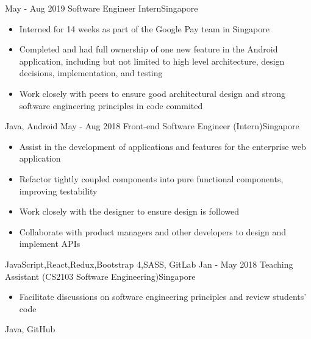 %
%
%

\begin{experiences}
  \experience
    {May - Aug 2019}   {Software Engineer Intern}{}{Singapore}
    {} {
                      \begin{itemize}
                        \item Interned for 14 weeks as part of the Google Pay team in Singapore
                        \item Completed and had full ownership of one new feature in the Android application, including but not limited to high level architecture, design decisions, implementation, and testing
                        \item Work closely with peers to ensure good architectural design and strong software engineering principles in code commited
                      \end{itemize}
                    }
                    {Java, Android}
  \emptySeparator
  \experience
    {May - Aug 2018}   {Front-end Software Engineer (Intern)}{}{Singapore}
    {} {
                      \begin{itemize}
                        \item Assist in the development of applications and features for the enterprise web application
                        \item Refactor tightly coupled components into pure functional components, improving testability
                        \item Work closely with the designer to ensure design is followed
                        \item Collaborate with product managers and other developers to design and implement APIs
                      \end{itemize}
                    }
                    {JavaScript,React,Redux,Bootstrap 4,SASS, GitLab}
  \emptySeparator
  \experience
    {Jan - May 2018} {Teaching Assistant (CS2103 Software Engineering)}{}{Singapore}
    {}    {
                      \begin{itemize}
                        \item Facilitate discussions on software engineering principles and review students' code
                      \end{itemize}
                    }
                    {Java, GitHub}
\end{experiences}
